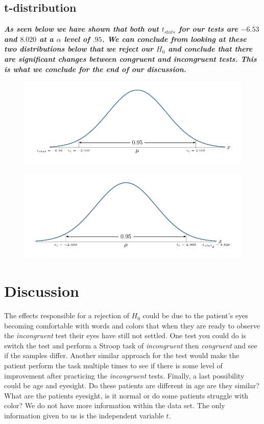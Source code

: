 \documentclass[8pt]{article}
\newcommand{\8}{\bar}
\begin{document}
\subsection{t-distribution} 
\textbf{\textit{As seen below we have shown that both out $t_{stats}$ for our tests are  $-6.53$ and $8.020$ at a $\alpha$ level of $.95$. We can conclude from looking at these two distributions below that we reject our $H_{0}$ and conclude that there are significant changes between congruent and incongruent tests. This is what we conclude for the end of our discussion.}}
\begin{figure}[H]
\includegraphics[page=1,scale=0.8]{t-distro.pdf}
\end{figure}

\begin{figure}[H]
\includegraphics[page=1,scale=0.8]{t_stat_d.pdf} 
\end{figure} 

\section{Discussion}
The effects responsible for a rejection of $H_{0}$ could be due to the patient's eyes becoming comfortable with words and colors that when they are ready to observe the \textit{incongruent} test their eyes have still not settled. One test you could do is switch the test and perform a Stroop task of \textit{incongruent} then \textit{congruent} and see if the samples differ. Another similar approach for the test would make the patient perform the task multiple times to see if there is some level of improvement after practicing the \textit{incongruent} tests. Finally, a last possibility could be age and eyesight. Do these patients are different in age are they similar? What are the patients eyesight, is it normal or do some patients struggle with color? We do not have more information within the data set. The only information given to us is the independent variable $t$. 
\end{document}
